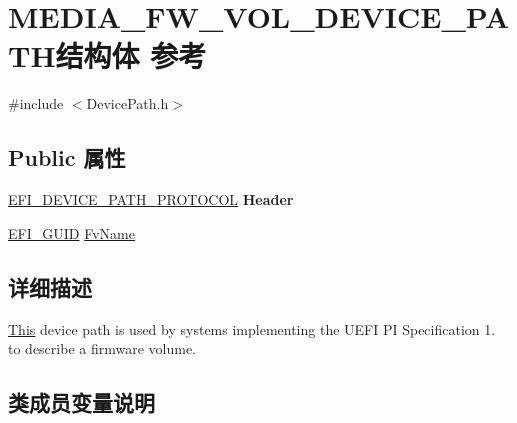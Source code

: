 \hypertarget{struct_m_e_d_i_a___f_w___v_o_l___d_e_v_i_c_e___p_a_t_h}{}\section{M\+E\+D\+I\+A\+\_\+\+F\+W\+\_\+\+V\+O\+L\+\_\+\+D\+E\+V\+I\+C\+E\+\_\+\+P\+A\+T\+H结构体 参考}
\label{struct_m_e_d_i_a___f_w___v_o_l___d_e_v_i_c_e___p_a_t_h}


{\ttfamily \#include $<$Device\+Path.\+h$>$}

\subsection*{Public 属性}
\begin{DoxyCompactItemize}
\item 
\mbox{\label{struct_m_e_d_i_a___f_w___v_o_l___d_e_v_i_c_e___p_a_t_h_a0e65d924713f27e94718257a6ff423f2}} 
\hyperlink{struct_e_f_i___d_e_v_i_c_e___p_a_t_h___p_r_o_t_o_c_o_l}{E\+F\+I\+\_\+\+D\+E\+V\+I\+C\+E\+\_\+\+P\+A\+T\+H\+\_\+\+P\+R\+O\+T\+O\+C\+OL} {\bfseries Header}
\item 
\hyperlink{_uefi_base_type_8h_ad87614428813f71edb2c2d802e9ce2af}{E\+F\+I\+\_\+\+G\+U\+ID} \hyperlink{struct_m_e_d_i_a___f_w___v_o_l___d_e_v_i_c_e___p_a_t_h_a4defd01775012abd177df1d3c895350c}{Fv\+Name}
\end{DoxyCompactItemize}


\subsection{详细描述}
\hyperlink{namespace_this}{This} device path is used by systems implementing the U\+E\+FI PI Specification 1. to describe a firmware volume. 

\subsection{类成员变量说明}
\mbox{\label{struct_m_e_d_i_a___f_w___v_o_l___d_e_v_i_c_e___p_a_t_h_a4defd01775012abd177df1d3c895350c}} 
